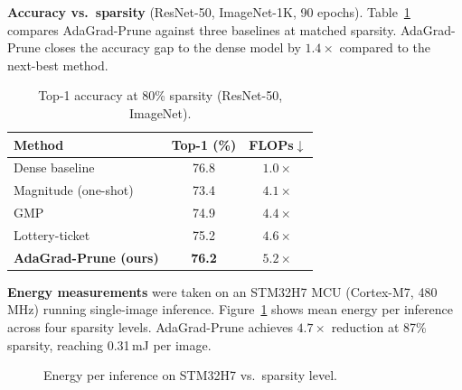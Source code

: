 \documentclass[10pt,twocolumn]{article}
\begin{document}
\textbf{Accuracy vs.\ sparsity} (ResNet-50, ImageNet-1K, 90 epochs).
Table~\ref{tab:accuracy} compares AdaGrad-Prune against three baselines at
matched sparsity.  AdaGrad-Prune closes the accuracy gap to the dense model
by $1.4\times$ compared to the next-best method.

\begin{table}[h]
\centering
\small
\caption{Top-1 accuracy at 80\% sparsity (ResNet-50, ImageNet).}
\label{tab:accuracy}
\begin{tabularx}{\linewidth}{@{}>{\raggedright\arraybackslash}Xcc@{}}
\toprule
\textbf{Method} & \textbf{Top-1 (\%)} & \textbf{FLOPs$\downarrow$} \\
\midrule
Dense baseline  & 76.8 & $1.0\times$ \\
Magnitude (one-shot) \cite{han2015deep} & 73.4 & $4.1\times$ \\
GMP \cite{zhu2018prune}          & 74.9 & $4.4\times$ \\
Lottery-ticket \cite{frankle2019lottery} & 75.2 & $4.6\times$ \\
\textbf{AdaGrad-Prune (ours)}    & \textbf{76.2} & \textbf{$5.2\times$} \\
\bottomrule
\end{tabularx}
\end{table}

\textbf{Energy measurements} were taken on an STM32H7 MCU (Cortex-M7,
480\,MHz) running single-image inference.
Figure~\ref{fig:energy} shows mean energy per inference across four
sparsity levels.  AdaGrad-Prune achieves $4.7\times$ reduction at 87\%
sparsity, reaching 0.31\,mJ per image.

\begin{figure}[h]
\centering
{}
\caption{Energy per inference on STM32H7 vs.\ sparsity level.}
\label{fig:energy}
\end{figure}
\end{document}
